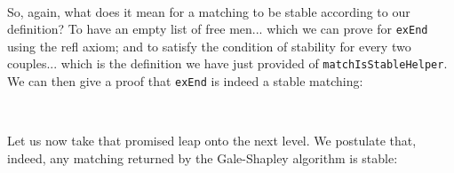 {\begin{code}
\>[.][@{}l@{}]\<[3244I]%
\>[24]\AgdaSymbol{(}\AgdaSpace{}%
\AgdaSymbol{(}\AgdaSpace{}%
\AgdaSymbol{(}\AgdaSpace{}%
\AgdaSymbol{())))}\<%
\\
\>[0]\AgdaSpace{}%
\AgdaSymbol{\AgdaUnderscore{}}\AgdaSpace{}%
\AgdaSymbol{\AgdaUnderscore{}}\AgdaSpace{}%
\AgdaSymbol{(}\AgdaSpace{}%
\AgdaSymbol{(}\AgdaSpace{}%
\AgdaSymbol{(}\AgdaSpace{}%
\AgdaSymbol{())))}\AgdaSpace{}%
\AgdaSymbol{\AgdaUnderscore{}}\AgdaSpace{}%
\AgdaSymbol{\AgdaUnderscore{}}\<%
\end{code}

So, again, what does it mean for a matching to be stable according to our definition? To have an empty list of free men... which we can prove for \texttt{exEnd} using the refl axiom; and to satisfy the condition of stability for every two couples... which is the definition we have just provided of \texttt{matchIsStableHelper}. We can then give a proof that \texttt{exEnd} is indeed a stable matching: 

\begin{code}%
\>[0]\AgdaSpace{}%
\AgdaSymbol{:}\AgdaSpace{}%
\AgdaSpace{}%
\<%
\\
\>[0]\AgdaSpace{}%
\AgdaSymbol{=}\AgdaSpace{}%
\AgdaSpace{}%
\AgdaOperator{\AgdaInductiveConstructor{,}}\AgdaSpace{}%
\<%
\end{code}

Let us now take that promised leap onto the next level. We postulate that, indeed, any matching returned by the Gale-Shapley algorithm is stable:

\begin{code}%
\>[0]\<%
\\
\>[0][@{}l@{\AgdaIndent{0}}]%
\>[2]\AgdaSpace{}%
\AgdaSymbol{:}\AgdaSpace{}%
\AgdaSpace{}%
\AgdaSymbol{(}\AgdaSpace{}%
\AgdaSpace{}%
\AgdaSymbol{:}\AgdaSpace{}%
\AgdaSymbol{)}\AgdaSpace{}%
\<%
\\
\>[2][@{}l@{\AgdaIndent{0}}]%
\>[19]\AgdaSpace{}%
\AgdaSpace{}%
\AgdaSpace{}%
\AgdaSpace{}%
\<%
\\
%
\>[19]\AgdaSpace{}%
\AgdaSpace{}%
\AgdaSpace{}%
\AgdaInductiveConstructor{[]}\AgdaSpace{}%
\<%
\\
%
\>[19]\AgdaSpace{}%
\<%
\end{code}

}
